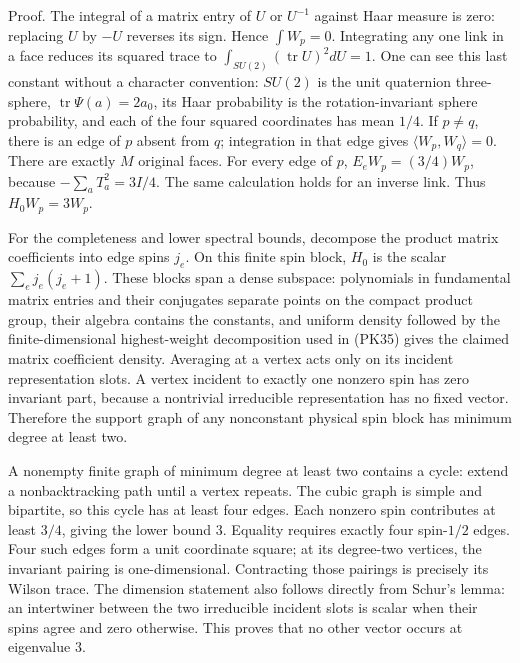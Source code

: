 \documentclass[11pt]{article}
\begin{document}
Proof. The integral of a matrix entry of \(U\) or \(U^{-1}\) against
Haar measure is zero: replacing \(U\) by \(-U\) reverses its sign. Hence
\(\int W_p=0\). Integrating any one link in a face reduces its squared
trace to \(\int_{SU(2)}(\operatorname{tr}U)^2dU=1\). One can see this last
constant without a character convention: \(SU(2)\) is the unit quaternion
three-sphere, \(\operatorname{tr}\Psi(a)=2a_0\), its Haar probability is
the rotation-invariant sphere probability, and each of the four squared
coordinates has mean \(1/4\). If \(p\ne q\), there is an edge of \(p\)
absent from \(q\); integration in that edge gives
\(\langle W_p,W_q\rangle=0\). There are exactly \(M\) original faces.
For every edge of \(p\),
\(E_eW_p=(3/4)W_p\), because \(-\sum_aT_a^2=3I/4\).
The same calculation holds for an inverse link. Thus \(H_0W_p=3W_p\).

For the completeness and lower spectral bounds, decompose the product
matrix coefficients into edge spins \(j_e\). On this finite spin block,
\(H_0\) is the scalar \(\sum_ej_e(j_e+1)\). These blocks span a dense
subspace: polynomials in fundamental matrix entries and their conjugates
separate points on the compact product group, their algebra contains the
constants, and uniform density followed by the finite-dimensional
highest-weight decomposition used in (PK35) gives the claimed matrix
coefficient density. Averaging at a vertex acts only on its incident
representation slots. A vertex incident to exactly one nonzero spin has
zero invariant part, because a nontrivial irreducible representation has
no fixed vector. Therefore the support graph of any nonconstant physical
spin block has minimum degree at least two.

A nonempty finite graph of minimum degree at least two contains a cycle:
extend a nonbacktracking path until a vertex repeats. The cubic graph is
simple and bipartite, so this cycle has at least four edges. Each nonzero
spin contributes at least \(3/4\), giving the lower bound \(3\). Equality
requires exactly four spin-\(1/2\) edges. Four such edges form a unit
coordinate square; at its degree-two vertices, the invariant pairing is
one-dimensional. Contracting those pairings is precisely its Wilson trace.
The dimension statement also follows directly from Schur's lemma: an
intertwiner between the two irreducible incident slots is scalar when their
spins agree and zero otherwise. This proves that no other vector occurs
at eigenvalue \(3\).
\end{document}
